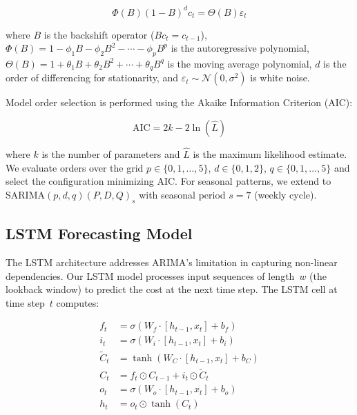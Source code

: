 \documentclass[conference]{IEEEtran}
\begin{document}
\begin{equation}
\Phi(B)(1-B)^d c_t = \Theta(B)\varepsilon_t
\label{eq:arima}
\end{equation}

\noindent where $B$ is the backshift operator ($Bc_t = c_{t-1}$), $\Phi(B) = 1 - \phi_1 B - \phi_2 B^2 - \cdots - \phi_p B^p$ is the autoregressive polynomial, $\Theta(B) = 1 + \theta_1 B + \theta_2 B^2 + \cdots + \theta_q B^q$ is the moving average polynomial, $d$ is the order of differencing for stationarity, and $\varepsilon_t \sim \mathcal{N}(0, \sigma^2)$ is white noise.

Model order selection is performed using the Akaike Information Criterion (AIC):

\begin{equation}
\text{AIC} = 2k - 2\ln(\hat{L})
\label{eq:aic}
\end{equation}

\noindent where $k$ is the number of parameters and $\hat{L}$ is the maximum likelihood estimate. We evaluate orders over the grid $p \in \{0,1,\ldots,5\}$, $d \in \{0,1,2\}$, $q \in \{0,1,\ldots,5\}$ and select the configuration minimizing AIC. For seasonal patterns, we extend to SARIMA$(p,d,q)(P,D,Q)_s$ with seasonal period $s = 7$ (weekly cycle).

\subsection{LSTM Forecasting Model}

The LSTM architecture addresses ARIMA's limitation in capturing non-linear dependencies. Our LSTM model processes input sequences of length~$w$ (the lookback window) to predict the cost at the next time step. The LSTM cell at time step~$t$ computes:

\begin{align}
f_t &= \sigma(W_f \cdot [h_{t-1}, x_t] + b_f) \label{eq:forget} \\
i_t &= \sigma(W_i \cdot [h_{t-1}, x_t] + b_i) \label{eq:input} \\
\tilde{C}_t &= \tanh(W_C \cdot [h_{t-1}, x_t] + b_C) \label{eq:candidate} \\
C_t &= f_t \odot C_{t-1} + i_t \odot \tilde{C}_t \label{eq:cellstate} \\
o_t &= \sigma(W_o \cdot [h_{t-1}, x_t] + b_o) \label{eq:output} \\
h_t &= o_t \odot \tanh(C_t) \label{eq:hidden}
\end{align}
\end{document}
